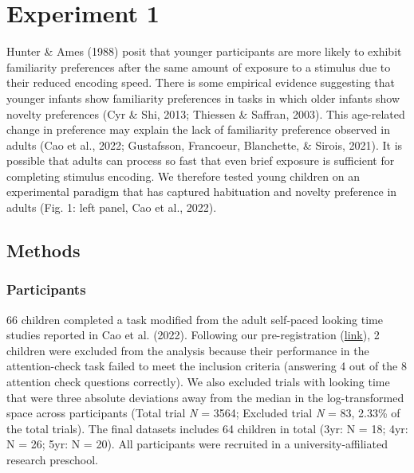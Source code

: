 \documentclass[10pt, letterpaper]{article}
\begin{document}
\hypertarget{experiment-1}{%
\section{Experiment 1}\label{experiment-1}}

Hunter \& Ames (1988) posit that younger participants are more likely to
exhibit familiarity preferences after the same amount of exposure to a
stimulus due to their reduced encoding speed. There is some empirical
evidence suggesting that younger infants show familiarity preferences in
tasks in which older infants show novelty preferences (Cyr \& Shi, 2013;
Thiessen \& Saffran, 2003). This age-related change in preference may
explain the lack of familiarity preference observed in adults (Cao et
al., 2022; Gustafsson, Francoeur, Blanchette, \& Sirois, 2021). It is
possible that adults can process so fast that even brief exposure is
sufficient for completing stimulus encoding. We therefore tested young
children on an experimental paradigm that has captured habituation and
novelty preference in adults (Fig. 1: left panel, Cao et al., 2022).

\hypertarget{methods}{%
\subsection{Methods}\label{methods}}

\hypertarget{participants}{%
\subsubsection{Participants}\label{participants}}

66 children completed a task modified from the adult self-paced looking
time studies reported in Cao et al. (2022). Following our
pre-registration
(\href{https://aspredicted.org/blind.php?x=5WQ_YQH}{link}), 2 children
were excluded from the analysis because their performance in the
attention-check task failed to meet the inclusion criteria (answering 4
out of the 8 attention check questions correctly). We also excluded
trials with looking time that were three absolute deviations away from
the median in the log-transformed space across participants (Total trial
\emph{N} = 3564; Excluded trial \emph{N} = 83, 2.33\% of the total
trials). The final datasets includes 64 children in total (3yr: N = 18;
4yr: N = 26; 5yr: N = 20). All participants were recruited in a
university-affiliated research preschool.
\end{document}
